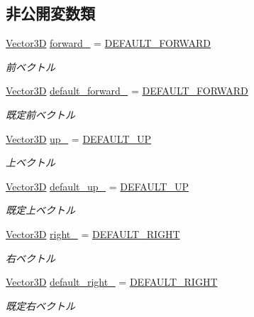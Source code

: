 \subsection*{非公開変数類}
\begin{DoxyCompactItemize}
\item 
\mbox{\hyperlink{class_vector3_d}{Vector3D}} \mbox{\hyperlink{class_axis_a9595934289a148d6acbbe65614669115}{forward\+\_\+}} = \mbox{\hyperlink{class_axis_a3360259f8662e72e5d86405647dc0188}{D\+E\+F\+A\+U\+L\+T\+\_\+\+F\+O\+R\+W\+A\+RD}}
\begin{DoxyCompactList}\small\item\em 前ベクトル \end{DoxyCompactList}\item 
\mbox{\hyperlink{class_vector3_d}{Vector3D}} \mbox{\hyperlink{class_axis_a7588c9e81446f5b2c69af24a11763309}{default\+\_\+forward\+\_\+}} = \mbox{\hyperlink{class_axis_a3360259f8662e72e5d86405647dc0188}{D\+E\+F\+A\+U\+L\+T\+\_\+\+F\+O\+R\+W\+A\+RD}}
\begin{DoxyCompactList}\small\item\em 既定前ベクトル \end{DoxyCompactList}\item 
\mbox{\hyperlink{class_vector3_d}{Vector3D}} \mbox{\hyperlink{class_axis_a7a09c9a41bd3576b12a7564e6aad7cb6}{up\+\_\+}} = \mbox{\hyperlink{class_axis_afe3787d2e4c4affc0c4ab43a5f52891e}{D\+E\+F\+A\+U\+L\+T\+\_\+\+UP}}
\begin{DoxyCompactList}\small\item\em 上ベクトル \end{DoxyCompactList}\item 
\mbox{\hyperlink{class_vector3_d}{Vector3D}} \mbox{\hyperlink{class_axis_a50d5dc8e7cc5443421948ae81676360f}{default\+\_\+up\+\_\+}} = \mbox{\hyperlink{class_axis_afe3787d2e4c4affc0c4ab43a5f52891e}{D\+E\+F\+A\+U\+L\+T\+\_\+\+UP}}
\begin{DoxyCompactList}\small\item\em 既定上ベクトル \end{DoxyCompactList}\item 
\mbox{\hyperlink{class_vector3_d}{Vector3D}} \mbox{\hyperlink{class_axis_a10577439f2638a389cc0f7d4f0a8dac8}{right\+\_\+}} = \mbox{\hyperlink{class_axis_a12c07eb8804a096a9c72d8f6d4abf6f7}{D\+E\+F\+A\+U\+L\+T\+\_\+\+R\+I\+G\+HT}}
\begin{DoxyCompactList}\small\item\em 右ベクトル \end{DoxyCompactList}\item 
\mbox{\hyperlink{class_vector3_d}{Vector3D}} \mbox{\hyperlink{class_axis_a30aa135ef84dba206ab95d28e1ad573b}{default\+\_\+right\+\_\+}} = \mbox{\hyperlink{class_axis_a12c07eb8804a096a9c72d8f6d4abf6f7}{D\+E\+F\+A\+U\+L\+T\+\_\+\+R\+I\+G\+HT}}
\begin{DoxyCompactList}\small\item\em 既定右ベクトル \end{DoxyCompactList}\end{DoxyCompactItemize}
